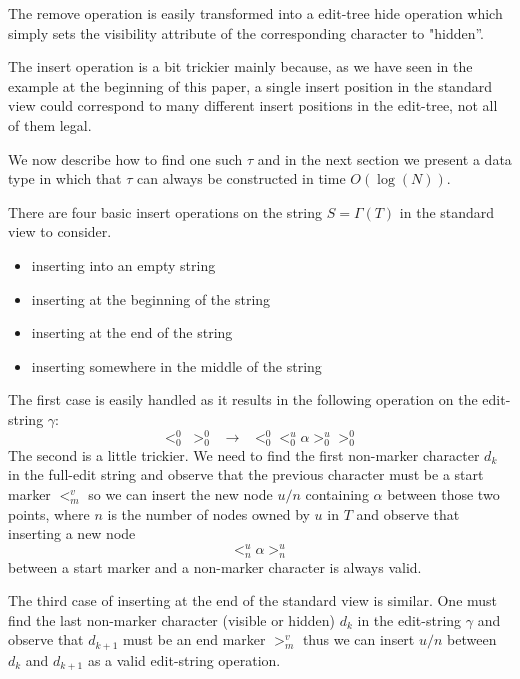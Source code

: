 \documentclass{amsart}
\begin{document}
The remove operation is easily transformed into a edit-tree hide operation which 
simply sets the visibility attribute of the corresponding character to "hidden''.

The insert operation is a bit trickier mainly because, as we have
seen in the example at the beginning of this paper,
a single insert position in
the standard view could correspond to many different insert positions in the 
edit-tree, not all of them legal.

We now describe how to find one such $\tau$ and in the next section we present a data type in which that $\tau$ can always be constructed in time $O(\log(N))$.


There are four basic insert operations on the string $S=\Gamma(T)$ in the standard view to consider.
\begin{itemize}
\item inserting into an empty string
\item inserting at the beginning of the string
\item inserting at the end of the string
\item inserting somewhere in the middle of the string 
\end{itemize}
The first case is easily handled as it results in the following operation on the 
edit-string $\gamma$:
\[
<^0_0\;>^0_0 \;\; \rightarrow \;\;<^0_0 <^u_0 \alpha >^u_0 >^0_0
\]
The second is a little trickier. We need to find the first non-marker character $d_k$
in the full-edit string and observe that the previous character must be a start
marker $<^v_m$ so we can insert the new node $u/n$ containing $\alpha$ between those
two points, where $n$ is the number of nodes owned by $u$ in $T$ and observe
that inserting a new node 
\[
<^u_n \alpha >^u_n
\]
between a start marker and a non-marker character is always valid.

The third case of inserting at the end of the standard view is similar. One
must find the last non-marker character (visible or hidden) $d_k$ in the
edit-string $\gamma$ and observe that $d_{k+1}$ must be an end marker
$>^v_m$ thus we can insert $u/n$ between $d_k$ and $d_{k+1}$ as a valid
edit-string operation.
\end{document}
